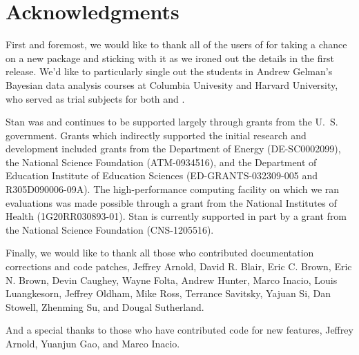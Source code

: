 \documentclass[article]{jss}
\begin{document}
\section*{Acknowledgments}

First and foremost, we would like to thank all of the users of
 for taking a chance on a new package and sticking with
it as we ironed out the details in the first release.  We'd like to
particularly single out the students in Andrew Gelman's Bayesian data
analysis courses at Columbia Univesity and Harvard University, who
served as trial subjects for both  and \cite{GelmanEtAl:2013}.

Stan was and continues to be supported largely through grants from the
U.~S. government.  Grants which indirectly supported the initial
research and development included grants from the Department of Energy
(DE-SC0002099), the National Science Foundation (ATM-0934516), and the
Department of Education Institute of Education Sciences
(ED-GRANTS-032309-005 and R305D090006-09A).  The high-performance
computing facility on which we ran evaluations was made possible
through a grant from the National Institutes of Health
(1G20RR030893-01).  Stan is currently supported in part by a grant
from the National Science Foundation (CNS-1205516).

Finally, we would like to thank all those who contributed
documentation corrections and code patches, Jeffrey Arnold, David
R. Blair, Eric C. Brown, Eric N. Brown, Devin Caughey, Wayne Folta,
Andrew Hunter, Marco Inacio, Louis Luangkesorn, Jeffrey Oldham, Mike
Ross, Terrance Savitsky, Yajuan Si, Dan Stowell, Zhenming Su, and
Dougal Sutherland.

And a special thanks to those who have contributed code for new
features, Jeffrey Arnold, Yuanjun Gao, and Marco Inacio. 
\end{document}
